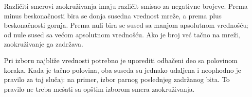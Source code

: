 Različiti smerovi zaokruživanja imaju različit smisao za negativne brojeve. Prema minus beskonačnosti bira se donja susedna vrednost mreže, a prema plus beskonačnosti gornja. Prema nuli bira se sused sa manjom apsolutnom vrednošću; od nule sused sa većom apsolutnom vrednošću. Ako je broj već tačno na mreži, zaokruživanje ga zadržava.

Pri izboru najbliže vrednosti potrebno je uporediti odbačeni deo sa polovinom koraka. Kada je tačno polovina, oba suseda su jednako udaljena i neophodno je pravilo za taj slučaj: na primer, izbor parnog poslednjeg zadržanog bita. To pravilo ne treba mešati sa opštim izborom smera zaokruživanja.
